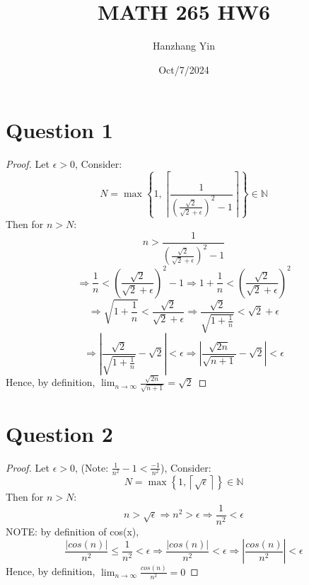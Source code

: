 \documentclass{article}
\title{MATH 265 HW6}
\author{Hanzhang Yin}
\date{Oct/7/2024}
\begin{document}
\maketitle

\section*{Question 1}
\begin{proof}
    Let $\epsilon > 0$, Consider:
    \[ N = \max\left\{1, \left\lceil \frac{1}{\left( \frac{\sqrt{2}}{\sqrt{2} + \epsilon} \right)^2 - 1 } \right\rceil \right\} \in \mathbb{N} \]
    Then for $n > N$:
    \[ n > \frac{1}{\left( \frac{\sqrt{2}}{\sqrt{2} + \epsilon} \right)^2 - 1} \]
    \[ \Rightarrow \frac{1}{n} < \left( \frac{\sqrt{2}}{\sqrt{2} + \epsilon} \right)^2 - 1 \Rightarrow 1 + \frac{1}{n} < \left( \frac{\sqrt{2}}{\sqrt{2} + \epsilon} \right)^2 \]
    \[ \Rightarrow \sqrt{1 + \frac{1}{n}} < \frac{\sqrt{2}}{\sqrt{2} + \epsilon} \Rightarrow \frac{\sqrt{2}}{\sqrt{1 + \frac{1}{n}}} < \sqrt{2} + \epsilon \]
    \[ \Rightarrow \left| \frac{\sqrt{2}}{\sqrt{1 + \frac{1}{n}}} - \sqrt{2} \right| < \epsilon \Rightarrow \left| \frac{\sqrt{2n}}{\sqrt{n + 1}} - \sqrt{2} \right| < \epsilon \]
    Hence, by definition, \( \lim_{n \to \infty} \frac{\sqrt{2n}}{\sqrt{n + 1}} = \sqrt{2} \)
\end{proof}

\section*{Question 2}
\begin{proof}
    Let $\epsilon > 0$, (Note: $\frac{1}{n^2} - 1 < \frac{-1}{n^2}$), Consider:
    \[ N = \max \left\{1, \left\lceil \sqrt{\epsilon} \right\rceil \right\} \in \mathbb{N} \]
    Then for $n > N$:
    \[ n > \sqrt{\epsilon} \Rightarrow n^2 > \epsilon \Rightarrow \frac{1}{n^2} < \epsilon \]
    NOTE: by definition of cos(x),
    \[ \frac{|cos(n)|}{n^2} \leq \frac{1}{n^2} < \epsilon \Rightarrow \frac{|cos(n)|}{n^2} < \epsilon \Rightarrow \left| \frac{cos(n)}{n^2} \right| < \epsilon \]
    Hence, by definition, \( \lim_{n \to \infty} \frac{cos(n)}{n^2} = 0 \)
\end{proof}
\end{document}
